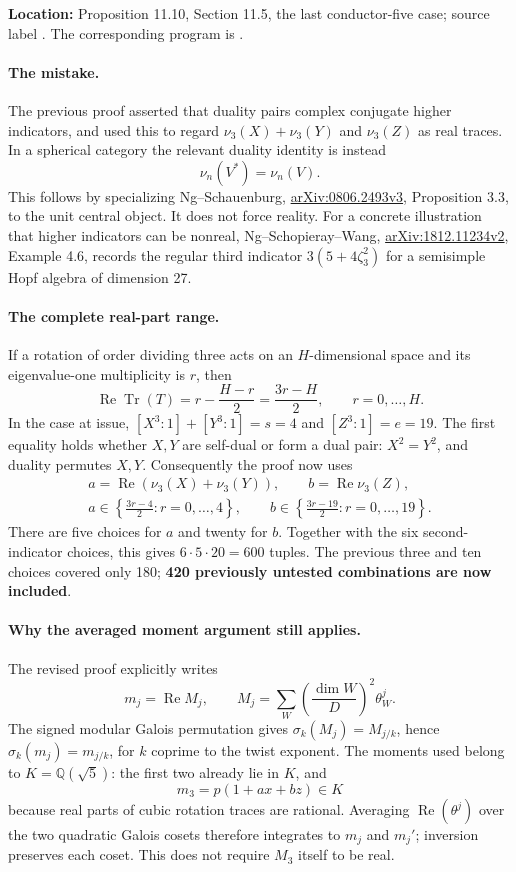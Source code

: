 \documentclass[11pt,a4paper]{article}
\newcommand{\Tr}{\operatorname{Tr}}
\begin{document}
\textbf{Location:} Proposition 11.10, Section 11.5, the last
conductor-five case; source label .
The corresponding program is .

\paragraph{The mistake.}
The previous proof asserted that duality pairs complex conjugate
higher indicators, and used this to regard
$\nu_3(X)+\nu_3(Y)$ and $\nu_3(Z)$ as real traces. In a spherical
category the relevant duality identity is instead
\[
                         \nu_n(V^*)=\nu_n(V).
\]
This follows by specializing Ng--Schauenburg,
\href{https://arxiv.org/pdf/0806.2493v3}{arXiv:0806.2493v3},
Proposition 3.3, to the unit central object. It does not force reality.
For a concrete illustration that higher indicators can be nonreal,
Ng--Schopieray--Wang,
\href{https://arxiv.org/pdf/1812.11234v2}{arXiv:1812.11234v2},
Example 4.6, records the regular third indicator
$3(5+4\zeta_3^2)$ for a semisimple Hopf algebra of dimension 27.

\paragraph{The complete real-part range.}
If a rotation of order dividing three acts on an $H$-dimensional
space and its eigenvalue-one multiplicity is $r$, then
\[
 \operatorname{Re}\Tr(T)
 =r-\frac{H-r}{2}=\frac{3r-H}{2},\qquad r=0,\ldots,H.
\]
In the case at issue,
$[X^3:1]+[Y^3:1]=s=4$ and $[Z^3:1]=e=19$.
The first equality holds whether $X,Y$ are self-dual or form a dual
pair: $X^2=Y^2$, and duality permutes $X,Y$.
Consequently the proof now uses
\[
\begin{gathered}
 a=\operatorname{Re}(\nu_3(X)+\nu_3(Y)),\qquad
 b=\operatorname{Re}\nu_3(Z),\\
 a\in\left\{\frac{3r-4}{2}:r=0,\ldots,4\right\},\qquad
 b\in\left\{\frac{3r-19}{2}:r=0,\ldots,19\right\}.
\end{gathered}
\]
There are five choices for $a$ and twenty for $b$. Together with
the six second-indicator choices, this gives $6\cdot5\cdot20=600$
tuples. The previous three and ten choices covered only 180;
\textbf{420 previously untested combinations are now included}.

\paragraph{Why the averaged moment argument still applies.}
The revised proof explicitly writes
\[
 m_j=\operatorname{Re}M_j,\qquad
 M_j=\sum_W\left(\frac{\dim W}{D}\right)^2\theta_W^j.
\]
The signed modular Galois permutation gives
$\sigma_k(M_j)=M_{j/k}$, hence
$\sigma_k(m_j)=m_{j/k}$, for $k$ coprime to the twist exponent.
The moments used belong to $K=\mathbb Q(\sqrt5)$: the first two
already lie in $K$, and
\[
                         m_3=p(1+ax+bz)\in K
\]
because real parts of cubic rotation traces are rational.
Averaging $\operatorname{Re}(\theta^j)$ over the two quadratic
Galois cosets therefore integrates to $m_j$ and $m_j'$;
inversion preserves each coset. This does not require $M_3$ itself
to be real.
\end{document}
